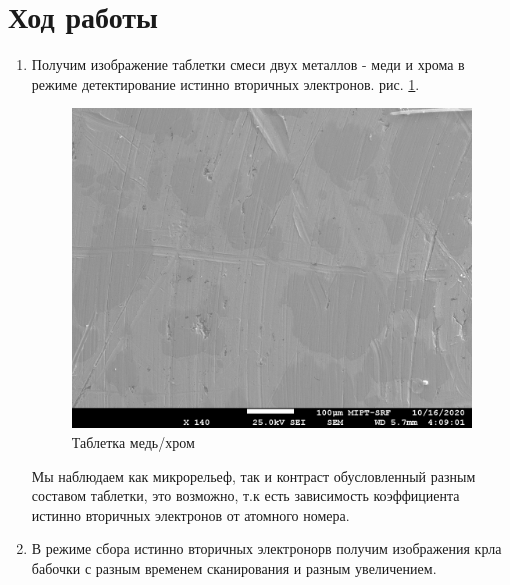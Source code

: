 \documentclass[a4paper]{article}
\begin{document}
\section{Ход работы}

\begin{enumerate}
    \item Получим изображение таблетки смеси двух металлов - меди и хрома в режиме детектирование истинно вторичных электронов. рис. \ref{tablet01}.
    
    \begin{figure}[H]
        \centering
        \includegraphics[scale = 0.9]{Tablet01.jpg}
        \caption{Таблетка медь/хром}
        \label{tablet01}
    \end{figure}

    Мы наблюдаем как микрорельеф, так и контраст обусловленный разным составом таблетки, это возможно, т.к есть зависимость коэффициента истинно вторичных электронов от атомного номера.

    \item В режиме сбора истинно вторичных электронорв получим изображения крла бабочки с разным временем сканирования и разным увеличением.
    

\end{enumerate}
\end{document}
